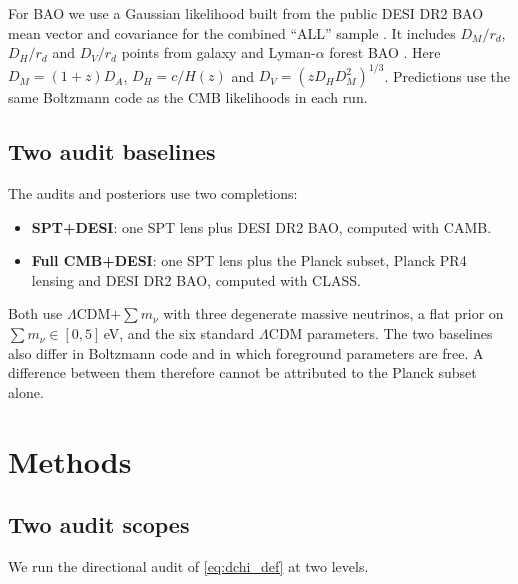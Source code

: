 \documentclass[11pt]{article}
\theoremstyle{remark}
\newcommand{\mnu}{\sum m_\nu}
\numberwithin{equation}{section}
\begin{document}
For BAO we use a Gaussian likelihood built from the public DESI DR2 BAO mean vector and covariance for the combined ``ALL'' sample \cite{desi_dr2_bao_docs,bao_data_v26,desi_dr2_results_ii_bao,desi_dr2_results_i_lya}. It includes $D_M/r_d$, $D_H/r_d$ and $D_V/r_d$ points from galaxy and Lyman-$\alpha$ forest BAO \cite{eisenstein2005_baopeak}. Here $D_M=(1+z)D_A$, $D_H=c/H(z)$ and $D_V=(zD_HD_M^2)^{1/3}$. Predictions use the same Boltzmann code as the CMB likelihoods in each run.

\subsection{Two audit baselines}
The audits and posteriors use two completions:
\begin{itemize}[leftmargin=*, itemsep=2pt]
  \item \textbf{SPT+DESI}: one SPT lens plus DESI DR2 BAO, computed with CAMB.
  \item \textbf{Full CMB+DESI}: one SPT lens plus the Planck subset, Planck PR4 lensing and DESI DR2 BAO, computed with CLASS.
\end{itemize}
Both use $\Lambda$CDM$+\mnu$ with three degenerate massive neutrinos, a flat prior on $\mnu\in[0,5]$\,eV, and the six standard $\Lambda$CDM parameters. The two baselines also differ in Boltzmann code and in which foreground parameters are free. A difference between them therefore cannot be attributed to the Planck subset alone.
 \section{Methods}
\label{sec:methods}

\subsection{Two audit scopes}
\label{sec:audit-metrics}

We run the directional audit of \cref{eq:dchi_def} at two levels.
\end{document}
